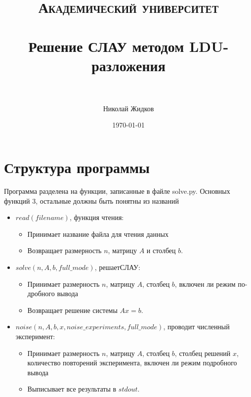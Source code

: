 \documentclass[paper=a4, fontsize=11pt]{scrartcl} %
\title{	
\normalfont \normalsize 
\textsc{Академический университет} \\ [25pt] %
\horrule{0.5pt} \\[0.4cm] %
\huge Решение СЛАУ методом LDU-разложения  \\ %
\horrule{2pt} \\[0.5cm] %
}
\author{Николай Жидков} %
\date{\normalsize\today} %
\numberwithin{equation}{section} %
\numberwithin{figure}{section} %
\numberwithin{table}{section} %
\begin{document}
\maketitle %


\section{Структура программы}

Программа разделена на функции, записанные в файле solve.py. Основных функций 3, остальные должны быть понятны из названий

\begin{itemize}
	\item $read(f ilename)$, функция чтения:
		\begin{itemize}
		\item Принимает название файла для чтения данных
		\item Возвращает размерность $n$, матрицу $A$ и столбец $b$.
		\end{itemize}
	\item $solve(n,A,b,full\_mode)$, решаетСЛАУ:
		\begin{itemize}
		\item Принимает размерность $n$, матрицу $A$, столбец $b$, включен ли режим по-
дробного вывода
		\item Возвращает решение системы $Ax = b$.
		\end{itemize}
    \item $noise(n,A,b,x,noise\_experiments,full\_mode)$, проводит численный эксперимент:
        \begin{itemize}
		\item Принимает размерность $n$, матрицу $A$, столбец $b$, столбец решений $x$, количество повторений эксперимента, включен ли режим подробного вывода
		\item Выписывает все результаты в $stdout$.
		\end{itemize}
\end{itemize}


\end{document}
